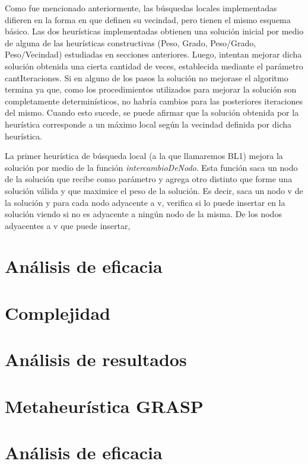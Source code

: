 \documentclass[a4paper,11pt] {article}
\begin{document}
Como fue mencionado anteriormente, las b\'usquedas locales implementadas difieren en la forma en que definen su vecindad, pero tienen el mismo esquema b\'asico. Las dos heur\'isticas implementadas obtienen una soluci\'on inicial por medio de alguna de las heur\'isticas constructivas (Peso, Grado, Peso/Grado, Peso/Vecindad) estudiadas en secciones anteriores. Luego, intentan mejorar dicha soluci\'on obtenida una cierta cantidad de veces, establecida mediante el par\'ametro cantIteraciones. Si en alguno de los pasos la soluci\'on no mejorase el algoritmo termina ya que, como los procedimientos utilizados para mejorar la soluci\'on son completamente determin\'isticos, no habr\'ia cambios para las posteriores iteraciones del mismo. Cuando esto sucede, se puede afirmar que la soluci\'on obtenida por la heur\'istica corresponde a un m\'aximo local seg\'un la vecindad definida por dicha heur\'istica.

La primer heur\'istica de b\'usqueda local (a la que llamaremos BL1) mejora la soluci\'on por medio de la funci\'on \textit{intercambioDeNodo}. Esta funci\'on saca un nodo de la soluci\'on que recibe como par\'ametro y agrega otro distinto que forme una soluci\'on v\'alida y que maximice el peso de la soluci\'on. Es decir, saca un nodo v de la soluci\'on y para cada nodo adyacente a v, verifica si lo puede insertar en la soluci\'on viendo si no es adyacente a ning\'un nodo de la misma. De los nodos adyacentes a v que puede insertar, 
\section*{An\'alisis de eficacia}

\section*{Complejidad}

\section*{An\'alisis de resultados}

\section{Metaheur\'istica GRASP}

\section*{An\'alisis de eficacia}
\end{document}
